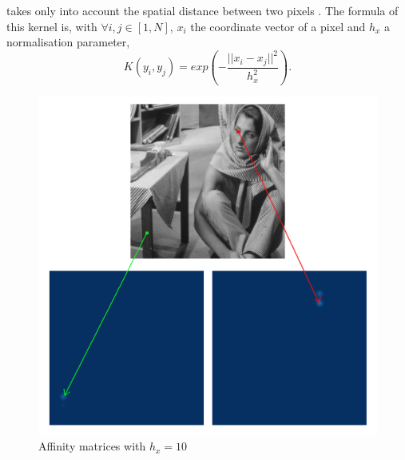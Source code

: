 \begin{description}[align=left]
 \item [Spatial Gaussian Kernel] takes only into account the spatial distance between two pixels \cite{siam_slides_2016}.
  The formula of this kernel is, with \(\forall i, j \in [1, N]\), \(x_i\) the coordinate vector of a pixel and \(h_x\) a normalisation parameter,
  \[K(y_i, y_j) = exp(-\frac{||x_i - x_j||^2}{h_x^2}).\]

  \begin{figure}[H]
      \centering
      \includegraphics[width=\textwidth]{img/spatialAffinitySigma10.png}
      \caption{Affinity matrices with \(h_x = 10\)}
  \end{figure}


\end{description}
